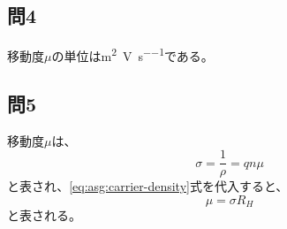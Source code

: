 \documentclass[../../../main]{subfiles}
\begin{document}
\subsection*{問4}
移動度$\mu$の単位は\si{\meter\squared\per\volt\per\second}である。

\subsection*{問5}
移動度$\mu$は、
\begin{equation}\label{eq:asg:mobility}
	\sigma = \dfrac{1}{\rho} = q n \mu
\end{equation}
と表され、\ref{eq:asg:carrier-density}式を代入すると、
\begin{equation}\label{eq:asg:mobility-1}
	\mu = \sigma R_H
\end{equation}
と表される。



\end{document}
